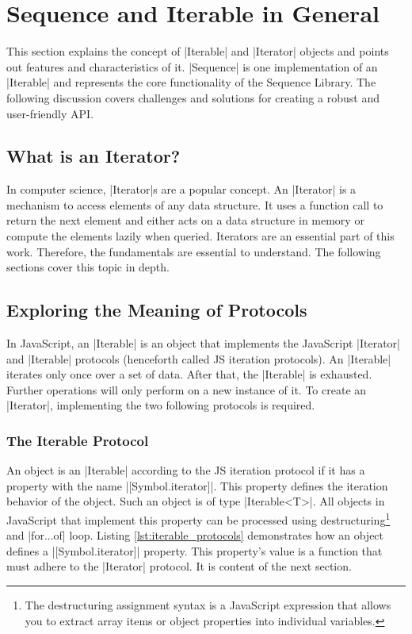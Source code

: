 \section{Sequence and Iterable in General}
\label{sec:Sequence and Iterable in General}
This section explains the concept of |Iterable| and |Iterator| objects and points
out features and characteristics of it. |Sequence| is one implementation of
an |Iterable| and represents the core functionality of the Sequence Library. The following
discussion covers challenges and solutions for creating a robust and
user-friendly API.

\subsection{What is an Iterator?}
\label{sub:What is an Iterator?}
In computer science, |Iterator|s are a popular concept. An |Iterator| is a mechanism 
to access elements of any data structure. It uses a function call to return the 
next element and either acts on a data structure in memory or compute the 
elements lazily when queried. Iterators are an essential part of this work. Therefore, 
the fundamentals are essential to understand. The following sections cover
this topic in depth.

\subsection{Exploring the Meaning of Protocols}
\label{sub:Exploring the Meaning of Protocols}
In JavaScript, an |Iterable| is an object that implements the JavaScript |Iterator|
and |Iterable| protocols \cite{mdn_protocols}
(henceforth called JS iteration protocols). An |Iterable| iterates only once 
over a set of data. After that, the |Iterable| is exhausted. Further operations 
will only perform on a new instance of it.
\newline
To create an |Iterator|, implementing the two following protocols is required.

\subsubsection{The Iterable Protocol}
\label{subsub:The Iterable Protocol}
An object is an |Iterable| according to the JS iteration protocol if it has a
property with the name |[Symbol.iterator]|. This property defines the iteration
behavior of the object. Such an object is of type |Iterable<T>|.
All objects in JavaScript that implement this property can be processed using 
destructuring\footnote{The destructuring assignment syntax is a JavaScript
expression that allows you to extract array items or object properties into
individual variables.} and |for...of| loop. 
Listing \ref{lst:iterable_protocols} demonstrates how an object defines a
|[Symbol.iterator]| property.
This property's value is a function that must adhere to the |Iterator| protocol.
It is content of the next section.

